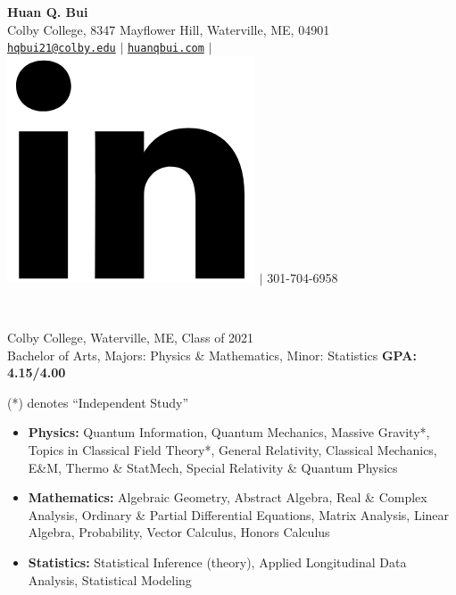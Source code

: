 \documentclass[letter, 10pt]{article}
\newcommand{\longunderline}[1]{\uline{#1\hfill\mbox{}}}
\begin{document}
	\begin{center}
		{\Large\textbf{Huan Q. Bui}}\\
		\smallskip
		Colby College, 8347 Mayflower Hill, Waterville, ME, 04901\\ \href{mailto:hqbui21@colby.edu}{\texttt{hqbui21@colby.edu}} $\vert$ \href{https://huanqbui.com}{\texttt{huanqbui.com}} $\vert$ \href{https://www.linkedin.com/in/huan-bui/}{\includegraphics[scale=0.04]{linkedin_logo.PNG}} $\vert$ 301-704-6958
	\end{center}
	\noindent \longunderline{\normalsize{{}}}\\
	\vspace{-7pt}
	
	
			\noindent Colby College, Waterville, ME, Class of 2021\\
			Bachelor of Arts, {Majors}: Physics \& Mathematics, {Minor}: Statistics \hfill \textbf{GPA: 4.15/4.00}\\
			\vspace{-7pt}

			 (*) denotes ``Independent Study''
			\begin{itemize}[noitemsep, nolistsep]
				\item \textbf{Physics:} Quantum Information, Quantum Mechanics, Massive Gravity*, Topics in Classical Field Theory*,  General Relativity, Classical Mechanics, E\&M, Thermo \& StatMech, Special Relativity \& Quantum Physics
				\item \textbf{Mathematics:} Algebraic Geometry, Abstract Algebra, Real \& Complex Analysis, Ordinary \& Partial Differential Equations, Matrix Analysis, Linear Algebra, Probability, Vector Calculus, Honors Calculus
				\item \textbf{Statistics:} Statistical Inference (theory), Applied Longitudinal Data Analysis, Statistical Modeling\\
			\end{itemize}
 
\end{document}
